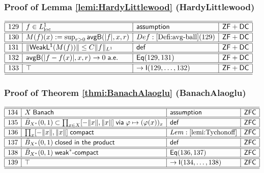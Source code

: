 \documentclass[11pt,reqno]{amsart}
\begin{document}
\medskip

\subsubsection*{Proof of Lemma \ref{lemi:HardyLittlewood} (\textsf{HardyLittlewood})}

\noindent$%
\begin{array}{|r|l|l|l|}
\hline\hline
129 & f\in L^{1}_{\mathrm{loc}} & \mathsf{assumption} & \mathsf{ZF+DC} \\ \hline\hline
130 & M(f)(x):=\sup_{r>0}\mathsf{avgB}(|f|,x,r) & Def:\ref{Defi:avg-ball}(129) & \mathsf{ZF+DC} \\ \hline\hline
131 & \|\mathsf{WeakL^{1}}(M(f))\|\le C\|f\|_{L^{1}} & \mathsf{def} & \mathsf{ZF+DC} \\ \hline\hline
132 & \mathsf{avgB}(|f-f(x)|,x,r)\to0\;\mathsf{a.e.} & \mathsf{Eq}(129,131) & \mathsf{ZF+DC} \\ \hline\hline
133 & \top & \to\mathsf{I}(129,\dots,132) & \mathsf{ZF+DC} \\ \hline\hline
\end{array}%
$

\medskip

\subsubsection*{Proof of Theorem \ref{thmi:BanachAlaoglu} (\textsf{BanachAlaoglu})}

\noindent$%
\begin{array}{|r|l|l|l|}
\hline\hline
134 & X\;\mathsf{Banach} & \mathsf{assumption} & \mathsf{ZFC} \\ \hline\hline
135 & \bar{B}_{X^{*}}(0,1)\subset\prod_{x\in X}[- \|x\|,\|x\|]\;\mathsf{via}\;\varphi\mapsto(\varphi(x))_{x} & \mathsf{def} & \mathsf{ZFC} \\ \hline\hline
136 & \prod_{x}[- \|x\|,\|x\|]\;\mathsf{compact} & Lem:\ref{lemi:Tychonoff} & \mathsf{ZFC} \\ \hline\hline
137 & \bar{B}_{X^{*}}(0,1)\;\mathsf{closed\ in\ the\ product} & \mathsf{def} & \mathsf{ZFC} \\ \hline\hline
138 & \bar{B}_{X^{*}}(0,1)\;\mathsf{weak}^{\ast }\text{-}\mathsf{compact} & \mathsf{Eq}(136,137) & \mathsf{ZFC} \\ \hline\hline
139 & \top & \to\mathsf{I}(134,\dots,138) & \mathsf{ZFC} \\ \hline\hline
\end{array}%
$
\end{document}
